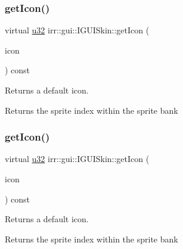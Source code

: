 \subsubsection{\texorpdfstring{get\+Icon()}{getIcon()}\hspace{0.1cm}{\footnotesize\ttfamily [1/2]}}
{\footnotesize\ttfamily virtual \hyperlink{namespaceirr_a0416a53257075833e7002efd0a18e804}{u32} irr\+::gui\+::\+I\+G\+U\+I\+Skin\+::get\+Icon (\begin{DoxyParamCaption}\item[{\hyperlink{namespaceirr_1_1gui_a8e54aa253459daf0b62670bda4556d9f}{E\+G\+U\+I\+\_\+\+D\+E\+F\+A\+U\+L\+T\+\_\+\+I\+C\+ON}}]{icon }\end{DoxyParamCaption}) const\hspace{0.3cm}{\ttfamily [pure virtual]}}



Returns a default icon. 

Returns the sprite index within the sprite bank \mbox{\label{classirr_1_1gui_1_1IGUISkin_a1b96a5dcaa7ffb9228fc2095be6b18c5}} 
\subsubsection{\texorpdfstring{get\+Icon()}{getIcon()}\hspace{0.1cm}{\footnotesize\ttfamily [2/2]}}
{\footnotesize\ttfamily virtual \hyperlink{namespaceirr_a0416a53257075833e7002efd0a18e804}{u32} irr\+::gui\+::\+I\+G\+U\+I\+Skin\+::get\+Icon (\begin{DoxyParamCaption}\item[{\hyperlink{namespaceirr_1_1gui_a8e54aa253459daf0b62670bda4556d9f}{E\+G\+U\+I\+\_\+\+D\+E\+F\+A\+U\+L\+T\+\_\+\+I\+C\+ON}}]{icon }\end{DoxyParamCaption}) const\hspace{0.3cm}{\ttfamily [pure virtual]}}



Returns a default icon. 

Returns the sprite index within the sprite bank \mbox{\label{classirr_1_1gui_1_1IGUISkin_a782a67363479b5cf7d085189774908ef}} 

